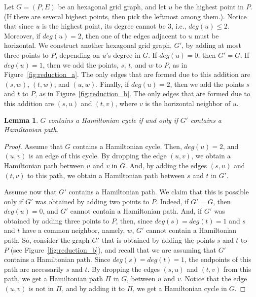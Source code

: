 \documentclass[11pt]{article}
\newtheorem{lemma}[theorem]{Lemma}
\begin{document}
Let $G=(P,E)$ be an hexagonal grid graph, and let $u$ be the highest point in $P$. (If there are several highest points, then pick the leftmost among them.). Notice that since $u$ is the highest point, its degree cannot be 3, i.e., $deg(u) \le 2$. 
Moreover, if $deg(u)=2$, then one of the edges adjacent to $u$ must be horizontal.
We construct another hexagonal grid graph, $G'$, by adding at most three points to $P$, depending on $u$'s degree in $G$.
If $deg(u)=0$, then $G' = G$.
If $deg(u)=1$, then we add the points, $s$, $t$, and $w$ to $P$, as in Figure~\ref{fig:reduction_a}. The only edges that are formed due to this addition are $(s,w)$, $(t,w)$, and $(u,w)$.
Finally, if $deg(u)=2$, then  we add the points $s$ and $t$ to $P$, as in Figure~\ref{fig:reduction_b}. The only edges that are formed due to this addition are $(s,u)$ and $(t,v)$, where $v$ is the horizontal neighbor of $u$.

\begin{lemma}
$G$ contains a Hamiltonian cycle if and only if $G'$ contains a Hamiltonian path.
\end{lemma}
\begin{proof}
Assume that $G$ contains a Hamiltonian cycle. Then, $deg(u)= 2$, and $(u,v)$ is an edge of this cycle. By dropping the edge $(u,v)$, we obtain a Hamiltonian path between $u$ and $v$ in $G$. And, by adding the edges $(s,u)$ and $(t,v)$ to this path, we obtain a Hamiltonian path between $s$ and $t$ in $G'$. 

Assume now that $G'$ contains a Hamiltonian path. We claim that this is possible only if $G'$ was obtained by adding two points to $P$. Indeed, if $G'=G$, then $deg(u)=0$, and $G'$ cannot contain a Hamiltonian path. And, if $G'$ was obtained by adding three points to $P$, then, since $deg(s)=deg(t)=1$ and $s$ and $t$ have a common neighbor, namely, $w$, $G'$ cannot contain a Hamiltonian path. 
So, consider the graph $G'$ that is obtained by adding the points $s$ and $t$ to $P$ (see Figure~\ref{fig:reduction_b}), and recall that we are assuming that $G'$ contains a Hamiltonian path. Since $deg(s)=deg(t)=1$, the endpoints of this path are necessarily $s$ and $t$. By dropping the edges $(s,u)$ and $(t,v)$ from this path, we get a Hamiltonian path $\Pi$ in $G$, between $u$ and $v$. Notice that the edge $(u,v)$ is not in $\Pi$, and by adding it to $\Pi$, we get a Hamiltonian cycle in $G$. 
\end{proof}
\end{document}
